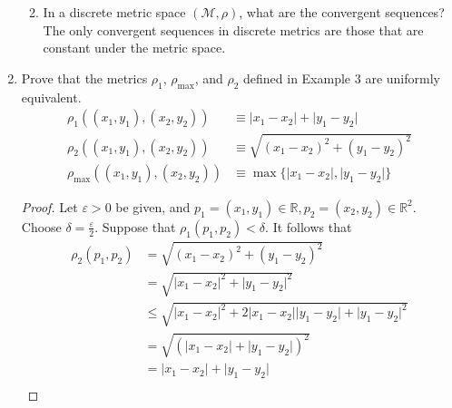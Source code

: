 \documentclass{article}
\begin{document}
\begin{enumerate}
\begin{enumerate}
\begin{equation}
                        \end{equation}
                  \item In a discrete metric space $(\mathcal{M}, \rho)$, what
                        are the convergent sequences?
                        \medbreak
                        The only convergent sequences in discrete metrics are those
                        that are constant under the metric space.
            \end{enumerate}
            \setcounter{enumi}{11}
      \item Prove that the metrics $\rho_1$, $\rho_{\max}$, and $\rho_2$ defined
            in Example 3 are uniformly equivalent.
            \begin{align}
                  \rho_1((x_1, y_1), (x_2, y_2))      & \equiv \lvert x_1-x_2\rvert + \lvert y_1-y_2\rvert        \\
                  \rho_2((x_1, y_1), (x_2, y_2))      & \equiv \sqrt{(x_1-x_2)^2 + (y_1-y_2)^2}                   \\
                  \rho_{\max}((x_1, y_1), (x_2, y_2)) & \equiv \max\{\lvert x_1-x_2\rvert, \lvert y_1-y_2\rvert\}
            \end{align}
            \begin{proof}
                  Let $\varepsilon>0$ be given, and $p_1=(x_1,y_1)\in\mathbb{R},p_2=(x_2,y_2)\in \mathbb{R}^2$.
                  Choose $\delta = \frac{\varepsilon}{2}$.
                  Suppose that $\rho_1(p_1,p_2)<\delta$. It follows that
                  \begin{align*}
                        \rho_2(p_1, p_2) & = \sqrt{(x_1-x_2)^2 + (y_1-y_2)^2}                                                                      \\
                                         & = \sqrt{\lvert x_1-x_2\rvert^2 + \lvert y_1-y_2\rvert^2}                                                \\
                                         & \leq \sqrt{\lvert x_1-x_2\rvert^2 + 2\lvert x_1-x_2\rvert\lvert y_1-y_2\rvert + \lvert y_1-y_2\rvert^2} \\
                                         & = \sqrt{(\lvert x_1-x_2\rvert+\lvert y_1-y_2\rvert)^2}                                                  \\
                                         & = \lvert x_1-x_2\rvert+\lvert y_1-y_2\rvert                                                             \\

\end{align*}
\end{proof}
\end{enumerate}
\end{document}
